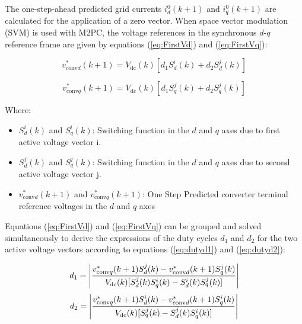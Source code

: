 The one-step-ahead predicted grid currents \(i^{0}_{d}(k+1)\) and
\(i^{0}_{q}(k+1)\) are calculated for the application of a zero vector.
When space vector modulation (SVM) is used with M2PC, the voltage
references in the synchronous \(d\)-\(q\) reference frame are given by
equations (\ref{eq:FirstVd}) and (\ref{eq:FirstVq}):

\begin{equation}
    v^{*}_{\mathrm{conv}d}(k+1)
    = V_{\mathrm{dc}}(k)
    \left[d_1 S^{i}_d(k) + d_2 S^{j}_d(k)\right]
    \label{eq:FirstVd}
\end{equation}

\begin{equation}
    v^{*}_{\mathrm{conv}q}(k+1)
    = V_{\mathrm{dc}}(k)
    \left[d_1 S^{j}_q(k) + d_2 S^{j}_q(k)\right]
    \label{eq:FirstVq}
\end{equation}

\noindent Where:
\begin{itemize}
	\item $S^{i}_d(k)$ and $S^{i}_q(k)$: Switching function in the $d$ and $q$ axes due to first active voltage vector i.
  \item $S^{j}_d(k)$ and $S^{j}_q(k)$: Switching function in the $d$ and $q$ axes due to second active voltage vector j.
  \item $v^{*}_{\mathrm{conv}d}(k+1)$ and $v^{*}_{\mathrm{conv}q}(k+1)$: One Step Predicted converter terminal reference voltages in the $d$ and $q$ axes
\end{itemize}

Equations (\ref{eq:FirstVd}) and (\ref{eq:FirstVq}) can be grouped and solved simultaneously to derive the expressions of the duty cycles $d_1$ and $d_2$ for the two active voltage vectors according to equations (\ref{eq:dutyd1}) and (\ref{eq:dutyd2}):

\begin{equation}
	d_1 = \left| \frac{v^{*}_{\mathrm{conv}q}(k+1)S^{j}_d(k) - v^{*}_{\mathrm{conv}d}(k+1)S^{j}_q(k) }{V_{\mathrm{dc}}(k)[S^{j}_d(k)S^{i}_q(k) - S^{i}_d(k)S^{j}_q(k)]}  \\ \right|
	\label{eq:dutyd1}
\end{equation}
\begin{equation}
	d_2 = \left| \frac{v^{*}_{\mathrm{conv}q}(k+1)S^{i}_d(k) - v^{*}_{\mathrm{conv}d}(k+1)S^{i}_q(k) }{V_{\mathrm{dc}}(k)[S^{j}_q(k) - S^{j}_d(k)S^{i}_q(k)]}  \\ \right|
	\label{eq:dutyd2}
\end{equation}

